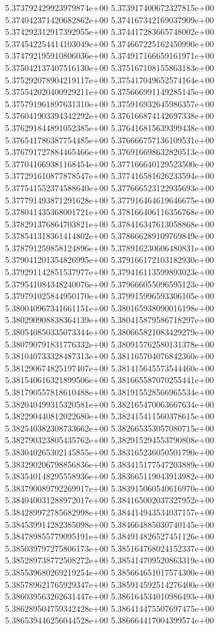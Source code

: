 5.373792429923979874e+00
5.373917400672327815e+00
5.374042371420682862e+00
5.374167342169037909e+00
5.374292312917392955e+00
5.374417283665748002e+00
5.374542254414103049e+00
5.374667225162450990e+00
5.374792195910806036e+00
5.374917166659161971e+00
5.375042137407516130e+00
5.375167108155863183e+00
5.375292078904219117e+00
5.375417049652574164e+00
5.375542020400929211e+00
5.375666991149285145e+00
5.375791961897631310e+00
5.375916932645986357e+00
5.376041903394342292e+00
5.376166874142697338e+00
5.376291844891052385e+00
5.376416815639399438e+00
5.376541786387754485e+00
5.376666757136109531e+00
5.376791727884465466e+00
5.376916698632820513e+00
5.377041669381168454e+00
5.377166640129523500e+00
5.377291610877878547e+00
5.377416581626233594e+00
5.377541552374588640e+00
5.377666523122935693e+00
5.377791493871291628e+00
5.377916464619646675e+00
5.378041435368001721e+00
5.378166406116356768e+00
5.378291376864703821e+00
5.378416347613058868e+00
5.378541318361414802e+00
5.378666289109769849e+00
5.378791259858124896e+00
5.378916230606480831e+00
5.379041201354826995e+00
5.379166172103182930e+00
5.379291142851537977e+00
5.379416113599893023e+00
5.379541084348240076e+00
5.379666055096595123e+00
5.379791025844950170e+00
5.379915996593306105e+00
5.380040967341661151e+00
5.380165938090016198e+00
5.380290908838364139e+00
5.380415879586718297e+00
5.380540850335073344e+00
5.380665821083429279e+00
5.380790791831776332e+00
5.380915762580131378e+00
5.381040733328487313e+00
5.381165704076842360e+00
5.381290674825197407e+00
5.381415645573544460e+00
5.381540616321899506e+00
5.381665587070255441e+00
5.381790557818610488e+00
5.381915528566965534e+00
5.382040499315320581e+00
5.382165470063667634e+00
5.382290440812022680e+00
5.382415411560378615e+00
5.382540382308733662e+00
5.382665353057080715e+00
5.382790323805435762e+00
5.382915294553790808e+00
5.383040265302145855e+00
5.383165236050501790e+00
5.383290206798856836e+00
5.383415177547203889e+00
5.383540148295558936e+00
5.383665119043913982e+00
5.383790089792269917e+00
5.383915060540616970e+00
5.384040031288972017e+00
5.384165002037327952e+00
5.384289972785682998e+00
5.384414943534037157e+00
5.384539914282385098e+00
5.384664885030740145e+00
5.384789855779095191e+00
5.384914826527451126e+00
5.385039797275806173e+00
5.385164768024152337e+00
5.385289738772508272e+00
5.385414709520863319e+00
5.385539680269219254e+00
5.385664651017574300e+00
5.385789621765929347e+00
5.385914592514276400e+00
5.386039563262631447e+00
5.386164534010986493e+00
5.386289504759342428e+00
5.386414475507697475e+00
5.386539446256044528e+00
5.386664417004399574e+00
